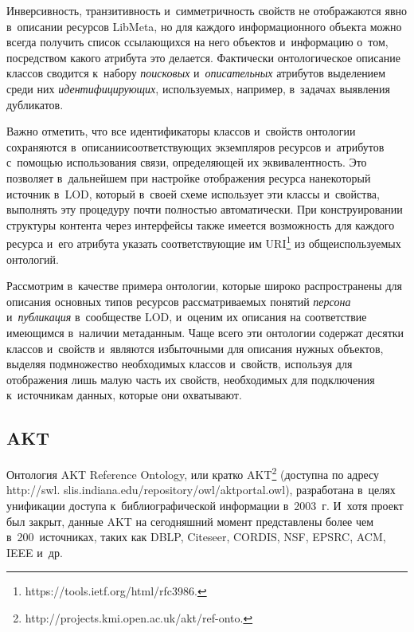 \begin{multicols}{2}
    Инверсивность, транзитивность и~симметричность свойств не 
отображаются явно в~описании ресурсов LibMeta, но для каждого 
информационного объекта можно всегда получить список ссылающихся на 
него объектов и~информацию о~том, посредством какого атрибута это 
делается. Фактически онтологическое описание классов сводится к~набору 
\textit{поисковых} и~\textit{описательных} атрибутов выделением среди них 
\textit{идентифицирующих}, используемых, например, в~задачах выявления 
дубликатов.
    
    Важно отметить, что все идентификаторы классов и~свойств онтологии 
сохраняются в~описании\linebreak соответствующих экземпляров ресурсов 
и~атрибутов с~помощью использования связи, опре\-де\-ля\-ющей их 
эквивалентность. Это позволяет в~дальнейшем при настройке отображения 
ресурса на\linebreak некоторый источник в~LOD, который в~своей схеме использует 
эти классы и~свойства, выполнять эту процедуру почти полностью 
автоматически. При конструировании структуры контента через интерфейсы 
также имеется возможность для каждого ресурса и~его атрибута указать 
соответствующие им URI\footnote[2]{{\sf https://tools.ietf.org/html/rfc3986.}} из 
общеиспользуемых онтологий. 
    
    Рассмотрим в~качестве примера онтологии, ко\-то\-рые широко 
распространены для описания основ\-ных типов ресурсов рассматриваемых 
понятий \textit{персона} и~\textit{пуб\-ли\-ка\-ция} в~сообществе LOD, 
и~оценим их описания на соответствие имеющимся в~наличии метаданным. 
Чаще всего эти онтологии содер\-жат десятки классов и~свойств и~являются 
избыточными для описания нужных объектов, выделяя подмножество 
необходимых классов и~свойств, используя для отображения лишь малую 
часть их свойств, необходимых для подключения к~источникам данных, 
которые они охватывают.

\vspace*{-4pt}
    
     \subsection*{AKT}
     
\vspace*{-2pt}
     
    Онтология AKT Reference Ontology, или кратко AKT\footnote[3]{ {\sf 
http://projects.kmi.open.ac.uk/akt/ref-onto.}} (доступна по адресу {\sf 
http://swl. slis.indiana.edu/repository/owl/aktportal.owl}), разработана в~целях 
унификации доступа к~библиографической информации в~2003~г. И~хотя 
проект был закрыт, данные AKT на сегодняшний момент представлены более 
чем в~200~источниках, таких как DBLP, Citeseer, CORDIS, NSF, EPSRC, 
ACM, IEEE и~др.
    

\end{multicols}
